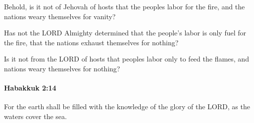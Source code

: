 			\begin{versebox}
					\item[BHS] 
					\item[LXX] 
					\item[ASV] Behold, is it not of Jehovah of hosts that the peoples labor for the fire, and the nations weary themselves for vanity?
					\item[NIV] Has not the LORD Almighty determined that the people’s labor is only fuel for the fire, that the nations exhaust themselves for nothing?
					\item[NRSV] Is it not from the LORD of hosts that peoples labor only to feed the flames, and nations weary themselves for nothing?
			\end{versebox}

		\paragraph{Habakkuk 2:14} %
			\label{HABAKKUK-2-14}

			For the earth shall be filled with the knowledge of the glory of the LORD, as the waters cover the sea.

